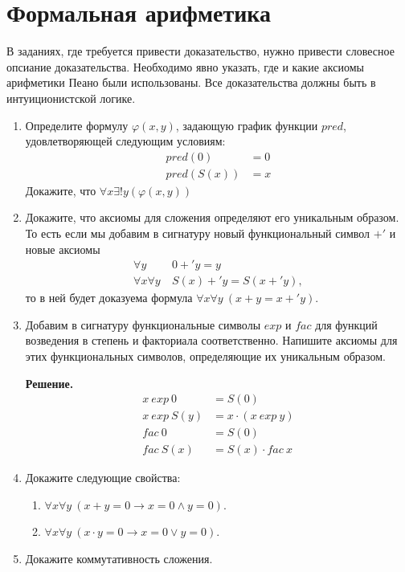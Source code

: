 \section*{Формальная арифметика}

В заданиях, где требуется привести доказательство, нужно привести словесное опсиание доказательства.
Необходимо явно указать, где и какие аксиомы арифметики Пеано были использованы.
Все доказательства должны быть в интуиционистской логике.
\begin{enumerate}
	
\item Определите формулу $\varphi(x,y)$, задающую график функции $pred$, удовлетворяющей следующим условиям:
\begin{align*}
pred(0) & = 0 \\
pred(S(x)) & = x
\end{align*}
Докажите, что $\forall x \exists! y (\varphi(x,y))$

\item Докажите, что аксиомы для сложения определяют его уникальным образом.
    То есть если мы добавим в сигнатуру новый функциональный символ $+'$ и новые аксиомы
\begin{align*}
\forall y\ & 0 +' y = y \tag{$+'0$} \\
\forall x \forall y\ & S(x) +' y = S(x +' y) \tag{$+'S$},
\end{align*}
то в ней будет доказуема формула $\forall x \forall y\ (x + y = x +' y)$.

\item Добавим в сигнатуру функциональные символы $exp$ и $fac$ для функций возведения в степень и факториала
соответственно.
    Напишите аксиомы для этих функциональных символов, определяющие их уникальным образом.

	\textbf{Решение.}
	\begin{align*}
		x \ exp \ 0 &= S(0)\\
		x \ exp \ S(y) &= x \cdot (x \ exp\ y) \\ 
		fac \ 0 &= S(0) \\
		fac \ S(x) &= S(x) \cdot fac\ x
	\end{align*}
	

\item Докажите следующие свойства:
\begin{enumerate}
\item $\forall x \forall y\ (x + y = 0 \to x = 0 \land y = 0)$.
\item $\forall x \forall y\ (x \cdot y = 0 \to x = 0 \lor y = 0)$.
\end{enumerate}

\item Докажите коммутативность сложения.

\end{enumerate}

